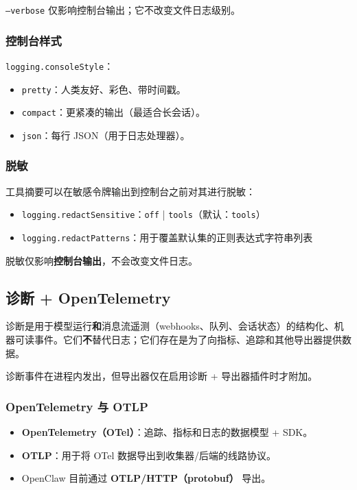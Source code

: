 \texttt{--verbose} 仅影响控制台输出；它不改变文件日志级别。

\subsubsection{控制台样式}


\texttt{logging.consoleStyle}：

\begin{itemize}
  \item \texttt{pretty}：人类友好、彩色、带时间戳。
  \item \texttt{compact}：更紧凑的输出（最适合长会话）。
  \item \texttt{json}：每行 JSON（用于日志处理器）。
\end{itemize}


\subsubsection{脱敏}


工具摘要可以在敏感令牌输出到控制台之前对其进行脱敏：

\begin{itemize}
  \item \texttt{logging.redactSensitive}：\texttt{off} | \texttt{tools}（默认：\texttt{tools}）
  \item \texttt{logging.redactPatterns}：用于覆盖默认集的正则表达式字符串列表
\end{itemize}


脱敏仅影响\textbf{控制台输出}，不会改变文件日志。

\subsection{诊断 + OpenTelemetry}


诊断是用于模型运行\textbf{和}消息流遥测（webhooks、队列、会话状态）的结构化、机器可读事件。它们\textbf{不}替代日志；它们存在是为了向指标、追踪和其他导出器提供数据。

诊断事件在进程内发出，但导出器仅在启用诊断 + 导出器插件时才附加。

\subsubsection{OpenTelemetry 与 OTLP}


\begin{itemize}
  \item \textbf{OpenTelemetry（OTel）}：追踪、指标和日志的数据模型 + SDK。
  \item \textbf{OTLP}：用于将 OTel 数据导出到收集器/后端的线路协议。
  \item OpenClaw 目前通过 \textbf{OTLP/HTTP（protobuf）} 导出。
\end{itemize}


